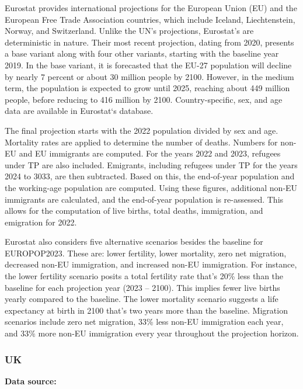 
Eurostat provides international projections for the European Union (EU) and the
European Free Trade Association countries, which include Iceland,
Liechtenstein, Norway, and Switzerland. Unlike the UN's projections, Eurostat's
are deterministic in nature. Their most recent projection, dating from 2020,
presents a base variant along with four other variants, starting with the
baseline year 2019. In the base variant, it is forecasted that the EU-27
population will decline by nearly 7 percent or about 30 million people by 2100.
However, in the medium term, the population is expected to grow until 2025,
reaching about 449 million people, before reducing to 416 million by 2100.
Country-specific, sex, and age data are available in Eurostat`s database.

The final projection starts with the 2022 population divided by sex and age.
Mortality rates are applied to determine the number of deaths. Numbers for
non-EU and EU immigrants are computed. For the years 2022 and 2023, refugees
under TP are also included. Emigrants, including refugees under TP for the
years 2024 to 3033, are then subtracted. Based on this, the end-of-year
population and the working-age population are computed. Using these figures,
additional non-EU immigrants are calculated, and the end-of-year population is
re-assessed. This allows for the computation of live births, total deaths,
immigration, and emigration for 2022.


Eurostat also considers five alternative scenarios besides the baseline for
EUROPOP2023. These are: lower fertility, lower mortality, zero net migration,
decreased non-EU immigration, and increased non-EU immigration. For instance,
the lower fertility scenario posits a total fertility rate that's 20\% less
than the baseline for each projection year (2023 -- 2100). This implies fewer
live births yearly compared to the baseline. The lower mortality scenario
suggests a life expectancy at birth in 2100 that's two years more than the
baseline. Migration scenarios include zero net migration, 33\% less non-EU
immigration each year, and 33\% more non-EU immigration every year throughout
the projection horizon.

\subsubsection{UK}

\textbf{Data source:}~\cite{ons2023population}


